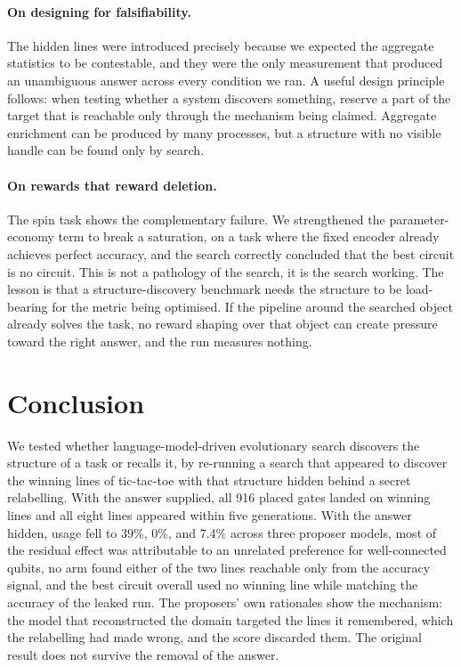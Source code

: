 \documentclass[11pt]{article}
\begin{document}
\paragraph{On designing for falsifiability.}
The hidden lines were introduced precisely because we expected the aggregate
statistics to be contestable, and they were the only measurement that produced an
unambiguous answer across every condition we ran. A useful design principle
follows: when testing whether a system discovers something, reserve a part of the
target that is reachable only through the mechanism being claimed. Aggregate
enrichment can be produced by many processes, but a structure with no visible
handle can be found only by search.

\paragraph{On rewards that reward deletion.}
The spin task shows the complementary failure. We strengthened the
parameter-economy term to break a saturation, on a task where the fixed encoder
already achieves perfect accuracy, and the search correctly concluded that the
best circuit is no circuit. This is not a pathology of the search, it is the
search working. The lesson is that a structure-discovery benchmark needs the
structure to be load-bearing for the metric being optimised. If the pipeline
around the searched object already solves the task, no reward shaping over that
object can create pressure toward the right answer, and the run measures nothing.

\section{Conclusion}

We tested whether language-model-driven evolutionary search discovers the
structure of a task or recalls it, by re-running a search that appeared to
discover the winning lines of tic-tac-toe with that structure hidden behind a
secret relabelling. With the answer supplied, all 916 placed gates landed on
winning lines and all eight lines appeared within five generations. With the
answer hidden, usage fell to 39\%, 0\%, and 7.4\% across three proposer models,
most of the residual effect was attributable to an unrelated preference for
well-connected qubits, no arm found either of the two lines reachable only from
the accuracy signal, and the best circuit overall used no winning line while
matching the accuracy of the leaked run. The proposers' own rationales show the
mechanism: the model that reconstructed the domain targeted the lines it
remembered, which the relabelling had made wrong, and the score discarded them.
The original result does not survive the removal of the answer.
\end{document}
